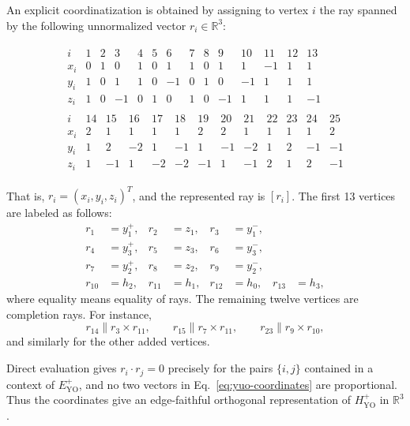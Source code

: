 \documentclass[aps,pra,twocolumn,superscriptaddress,10pt]{revtex4-2}
\newcommand{\R}{\mathbb{R}}
\newcommand{\YO}{\mathrm{YO}}
\begin{document}
An explicit coordinatization is obtained by assigning to vertex $i$ the ray
spanned by the following unnormalized vector $r_i\in\R^3$:
\begin{widetext}
\begin{align}\label{eq:yuo-coordinates}
\begin{array}{c|rrrrrrrrrrrrr}
 i      &1&2&3&4&5&6&7&8&9&10&11&12&13\\ \hline
 x_i    &0&1&0&1&0&1&1&0&1& 1&-1&1& 1\\
 y_i    &1&0&1&1&0&-1&0&1&0&-1& 1&1& 1\\
 z_i    &1&0&-1&0&1&0&1&0&-1& 1& 1&1&-1
\end{array}
\\[1ex]
\begin{array}{c|rrrrrrrrrrrr}
 i      &14&15&16&17&18&19&20&21&22&23&24&25\\ \hline
 x_i    &2&1&1&1&1&2&2&1&1&1&1&2\\
 y_i    &1&2&-2&1&-1&1&-1&-2&1&2&-1&-1\\
 z_i    &1&-1&1&-2&-2&-1&1&-1&2&1&2&-1
\end{array}
\end{align}
\end{widetext}
That is, $r_i=(x_i,y_i,z_i)^T$, and the represented ray is $[r_i]$.
The first 13 vertices are labeled as follows:
\begin{align*}
 r_1&=y_1^+,& r_2&=z_1,& r_3&=y_1^-,\\
 r_4&=y_3^+,& r_5&=z_3,& r_6&=y_3^-,\\
 r_7&=y_2^+,& r_8&=z_2,& r_9&=y_2^-,\\
 r_{10}&=h_2,& r_{11}&=h_1,& r_{12}&=h_0,& r_{13}&=h_3,
\end{align*}
where equality means equality of rays.  The remaining twelve vertices are
completion rays.  For instance,
\[
    r_{14}\parallel r_3\times r_{11},\qquad
    r_{15}\parallel r_7\times r_{11},\qquad
    r_{23}\parallel r_9\times r_{10},
\]
and similarly for the other added vertices.

Direct evaluation gives $r_i\cdot r_j=0$ precisely for the pairs $\{i,j\}$
contained in a context of $E_{\YO}^{+}$, and no two vectors in
Eq.~\eqref{eq:yuo-coordinates} are proportional.
Thus the coordinates give an edge-faithful orthogonal representation of
$H_{\YO}^{+}$ in $\R^3$.
\end{document}
